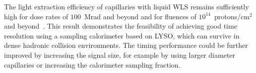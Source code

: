 The light extraction efficiency of capillaries with liquid WLS remains
sufficiently high for dose rates of $100$~Mrad and beyond and for fluences of
$10^{14}$~protons/$\mathrm{cm}^{2}$ and beyond~\cite{shashlik2}. This result
demonstrates the feasibility of achieving good time resolution using a sampling
calorimeter based on LYSO, which can survive in dense hadronic collision
environments. The timing performance could be further improved by increasing
the signal size, for example by using larger diameter capillaries or increasing
the calorimeter sampling fraction. 


